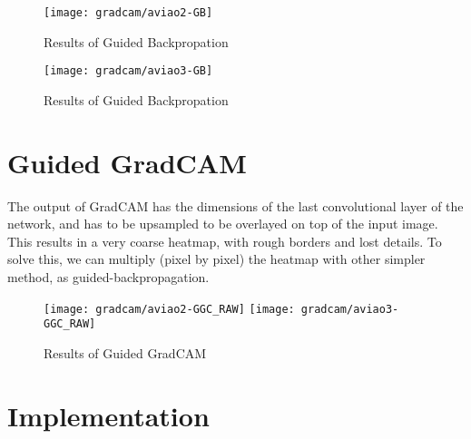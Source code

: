 \begin{figure} [H]
    \centering
    \texttt{[image: gradcam/aviao2-GB]}    
    \caption{Results of Guided Backpropation}
\end{figure}

\begin{figure} [H]
    \centering
    \texttt{[image: gradcam/aviao3-GB]}    
    \caption{Results of Guided Backpropation}
\end{figure}

\section{Guided GradCAM}

The output of GradCAM has the dimensions of the last convolutional layer of the network, and has to be upsampled to be overlayed on top of the input image. This results in a very coarse heatmap, with rough borders and lost details. To solve this, we can multiply (pixel by pixel) the heatmap with other simpler method, as guided-backpropagation. 

\begin{figure} [H]
    \centering
    \texttt{[image: gradcam/aviao2-GGC\_RAW]}
    \texttt{[image: gradcam/aviao3-GGC\_RAW]}
    \caption{Results of Guided GradCAM}
\end{figure}


\section{Implementation}

